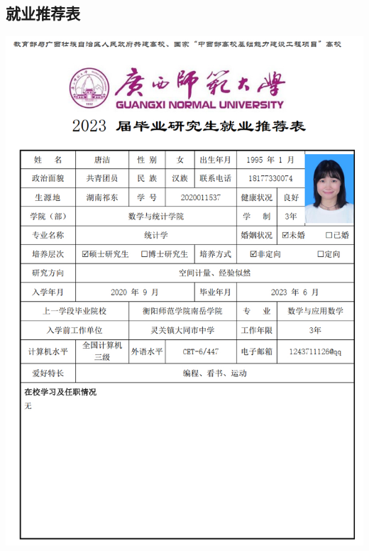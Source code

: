 \documentclass[UFT8]{ctexart}%
\begin{document}
\subsection{就业推荐表}
\begin{center}
  \includegraphics[scale=0.5]{figs/硕士就业推荐表1.JPG }

\end{center}
\end{document}
